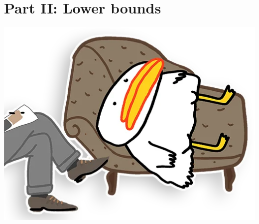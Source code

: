 \section{Part II: Lower bounds}

\begin{frame}
    \centering
    \insertsectionhead

    \vspace{0.4cm}
    \includegraphics[scale = 0.25]{pics/utia-depression.png}
\end{frame}

